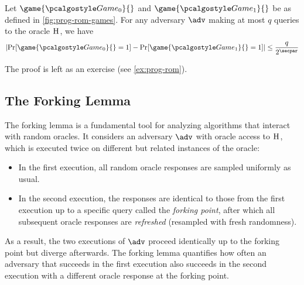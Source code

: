 \begin{proposition}\label{prop:prog-rom}
  Let $\game{\Game_0}{}$ and $\game{\Game_1}{}$ be as defined in \autoref{fig:prog-rom-games}.
  For any adversary $\adv$ making at most $q$ queries to the oracle ${\normalfont\textsc{H}}$, we have
  \[
  \left|\Pr[\game{\Game_0}{} = 1] - \Pr[\game{\Game_1}{} = 1]\right| \leq \frac{q}{2^\secpar}
  \]
\end{proposition}

The proof is left as an exercise (see \autoref{ex:prog-rom}).

\subsection{The Forking Lemma}

The forking lemma is a fundamental tool for analyzing algorithms that interact with random oracles. It considers an adversary $\adv$ with oracle access to ${\normalfont\textsc{H}}$, which is executed twice on different but related instances of the oracle:

\begin{itemize}
  \item In the first execution, all random oracle responses are sampled uniformly as usual.
  \item In the second execution, the responses are identical to those from the first execution up to a specific query called the \emph{forking point}, after which all subsequent oracle responses are \emph{refreshed} (resampled with fresh randomness).
\end{itemize}

As a result, the two executions of $\adv$ proceed identically up to the forking point but diverge afterwards. The forking lemma quantifies how often an adversary that succeeds in the first execution also succeeds in the second execution with a different oracle response at the forking point.

